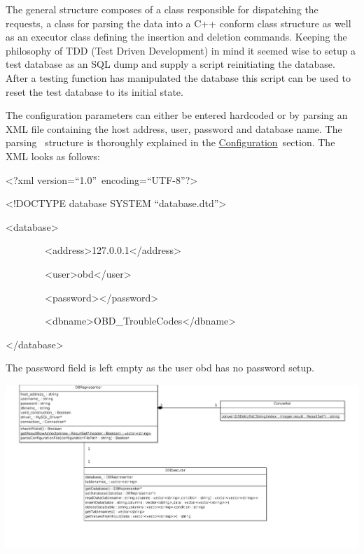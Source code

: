 {The general structure composes of a class responsible for dispatching
the requests, a class for parsing the data into a C++ conform class
structure as well as an executor class defining the insertion and
deletion commands. Keeping the philosophy of TDD (Test Driven
Development) in mind it seemed wise to setup a test database as an SQL
dump and supply a script reinitiating the database. After a testing
function has manipulated the database this script can be used to reset
the test database to its initial state. }

{The configuration parameters can either be entered hardcoded or by
parsing an XML file containing the host address, user, password and
database name. The parsing ~structure is thoroughly explained in the
}{\protect\hyperlink{h.ndb5fg1te708}{Configuration}}{~section. The XML
looks as follows:}

{}

{\textless{}?}{xml
version}{=}{``1.0''}{~encoding}{=}{``UTF-8''}{?\textgreater{}}

{\textless{}!DOCTYPE database SYSTEM ``database.dtd''\textgreater{}}

{\textless{}database\textgreater{}}

{~~~~~~~~}{\textless{}address\textgreater{}}{127.0.0.1}{\textless{}/address\textgreater{}}

{~~~~~~~~}{\textless{}user\textgreater{}}{obd}{\textless{}/user\textgreater{}}

{~~~~~~~~}{\textless{}password\textgreater{}\textless{}/password\textgreater{}}

{~~~~~~~~}{\textless{}dbname\textgreater{}}{OBD\_TroubleCodes}{\textless{}/dbname\textgreater{}}

{\textless{}/database\textgreater{}}

{The password field is left empty as the user obd has no password setup.
~}

{\includegraphics{images/image10.png}}

